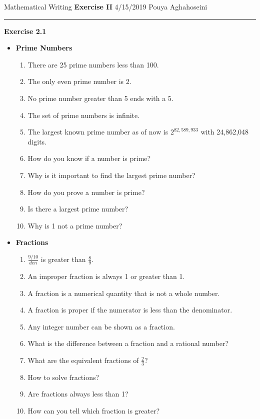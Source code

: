 \documentclass{article}
\begin{document}
\noindent
Mathematical Writing \hfill \textbf{Exercise II} \newline 
{4/15/2019} \hfill Pouya Aghahoseini

\noindent
\rule{\linewidth}{0.4pt}
\textbf{\large\color{blue} Exercise 2.1}
\begin{itemize}
	\item \textbf{Prime Numbers}
	\begin{enumerate}
		\item 
		There are 25 prime numbers less than 100.
		\item
		The only even prime number is 2.
		\item 
		No prime number greater than 5 ends with a 5.
		\item 
		The set of prime numbers is infinite.
		\item 
		The largest known prime number as of now is $2^{82,589,933}$ with 24,862,048 digits.
		\item 
		How do you know if a number is prime?
		\item 
		Why is it important to find the largest prime number?
		\item 
		How do you prove a number is prime?
		\item 
		Is there a largest prime number?
		\item 
		Why is 1 not a prime number?
	\end{enumerate}
	\item \textbf{Fractions}
	\begin{enumerate}
		\item 
		$\frac{9/10}{den}$ is greater than $\frac{8}{9}$.
		\item 
		An improper fraction is always 1 or greater than 1.
		\item 
		 A fraction is a numerical quantity that is not a whole number.
		\item 
		 A fraction is proper if the numerator is less than the denominator.
		\item 
		Any integer number can be shown as a fraction.
		\item 
		What is the difference between a fraction and a rational number?
		\item 
		What are the equivalent fractions of $\frac{2}{3}$?
		\item 
		How to solve fractions?
		\item 
		Are fractions always less than 1?
		\item
		How can you tell which fraction is greater?
	\end{enumerate}

\end{itemize}
\end{document}
